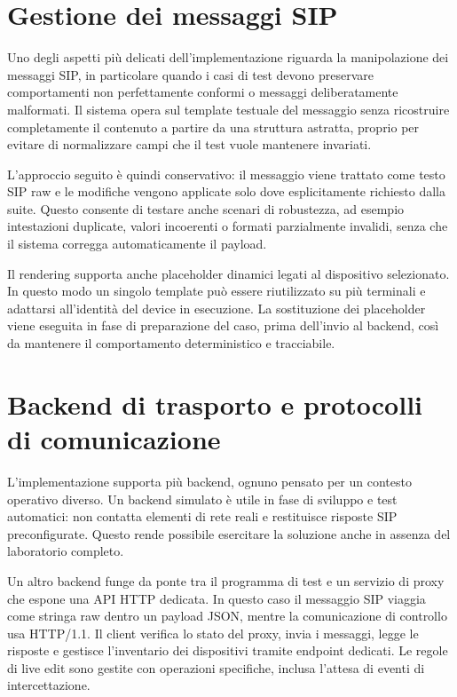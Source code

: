\section{Gestione dei messaggi SIP}

Uno degli aspetti pi\`u delicati dell'implementazione riguarda la manipolazione dei messaggi SIP, in particolare quando i casi di test devono preservare comportamenti non perfettamente conformi o messaggi deliberatamente malformati. Il sistema opera sul template testuale del messaggio senza ricostruire completamente il contenuto a partire da una struttura astratta, proprio per evitare di normalizzare campi che il test vuole mantenere invariati.

L'approccio seguito \`e quindi conservativo: il messaggio viene trattato come testo SIP raw e le modifiche vengono applicate solo dove esplicitamente richiesto dalla suite. Questo consente di testare anche scenari di robustezza, ad esempio intestazioni duplicate, valori incoerenti o formati parzialmente invalidi, senza che il sistema corregga automaticamente il payload.

Il rendering supporta anche placeholder dinamici legati al dispositivo selezionato. In questo modo un singolo template pu\`o essere riutilizzato su pi\`u terminali e adattarsi all'identit\`a del device in esecuzione. La sostituzione dei placeholder viene eseguita in fase di preparazione del caso, prima dell'invio al backend, cos\`i da mantenere il comportamento deterministico e tracciabile.

\section{Backend di trasporto e protocolli di comunicazione}

L'implementazione supporta pi\`u backend, ognuno pensato per un contesto operativo diverso. Un backend simulato \`e utile in fase di sviluppo e test automatici: non contatta elementi di rete reali e restituisce risposte SIP preconfigurate. Questo rende possibile esercitare la soluzione anche in assenza del laboratorio completo.

Un altro backend funge da ponte tra il programma di test e un servizio di proxy che espone una API HTTP dedicata. In questo caso il messaggio SIP viaggia come stringa raw dentro un payload JSON, mentre la comunicazione di controllo usa HTTP/1.1. Il client verifica lo stato del proxy, invia i messaggi, legge le risposte e gestisce l'inventario dei dispositivi tramite endpoint dedicati. Le regole di live edit sono gestite con operazioni specifiche, inclusa l'attesa di eventi di intercettazione.

